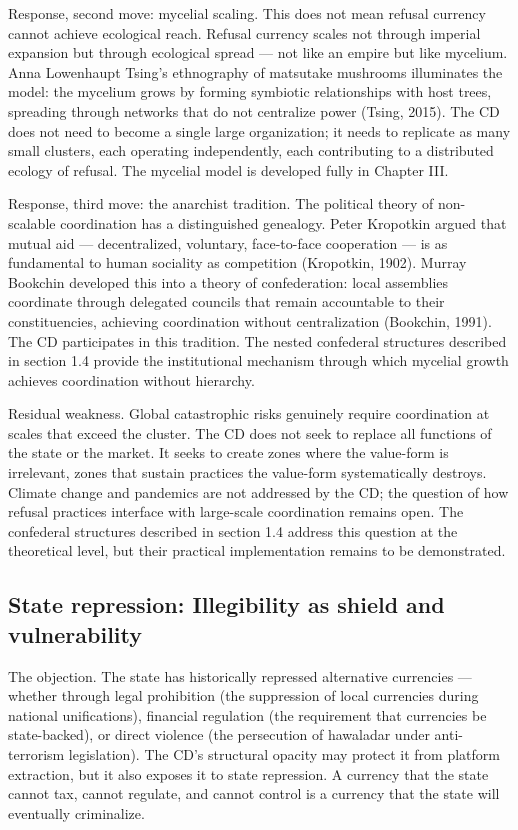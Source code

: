 Response, second move: mycelial scaling. This does not mean refusal currency cannot achieve ecological reach. Refusal currency scales not through imperial expansion but through ecological spread — not like an empire but like mycelium. Anna Lowenhaupt Tsing's ethnography of matsutake mushrooms illuminates the model: the mycelium grows by forming symbiotic relationships with host trees, spreading through networks that do not centralize power (Tsing, 2015). The CD does not need to become a single large organization; it needs to replicate as many small clusters, each operating independently, each contributing to a distributed ecology of refusal. The mycelial model is developed fully in Chapter III.

Response, third move: the anarchist tradition. The political theory of non-scalable coordination has a distinguished genealogy. Peter Kropotkin argued that mutual aid — decentralized, voluntary, face-to-face cooperation — is as fundamental to human sociality as competition (Kropotkin, 1902). Murray Bookchin developed this into a theory of confederation: local assemblies coordinate through delegated councils that remain accountable to their constituencies, achieving coordination without centralization (Bookchin, 1991). The CD participates in this tradition. The nested confederal structures described in section 1.4 provide the institutional mechanism through which mycelial growth achieves coordination without hierarchy.

Residual weakness. Global catastrophic risks genuinely require coordination at scales that exceed the cluster. The CD does not seek to replace all functions of the state or the market. It seeks to create zones where the value-form is irrelevant, zones that sustain practices the value-form systematically destroys. Climate change and pandemics are not addressed by the CD; the question of how refusal practices interface with large-scale coordination remains open. The confederal structures described in section 1.4 address this question at the theoretical level, but their practical implementation remains to be demonstrated.

\subsection{State repression: Illegibility as shield and vulnerability}

The objection. The state has historically repressed alternative currencies — whether through legal prohibition (the suppression of local currencies during national unifications), financial regulation (the requirement that currencies be state-backed), or direct violence (the persecution of hawaladar under anti-terrorism legislation). The CD's structural opacity may protect it from platform extraction, but it also exposes it to state repression. A currency that the state cannot tax, cannot regulate, and cannot control is a currency that the state will eventually criminalize.

